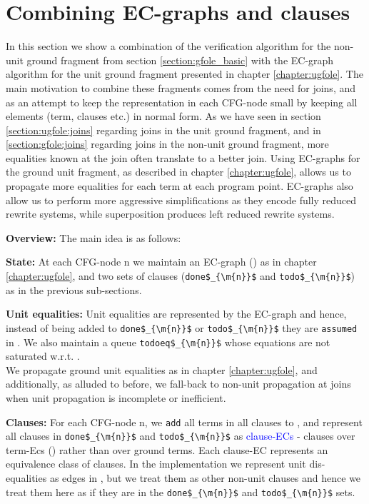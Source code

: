 \chapter{Combining EC-graphs and clauses}\label{section:appendix:gfole_ECGraph}
In this section we show a combination of the verification algorithm for the non-unit ground fragment from section \ref{section:gfole_basic} with the EC-graph algorithm for the unit ground fragment presented in chapter \ref{chapter:ugfole}.
The main motivation to combine these fragments comes from the need for joins, and as an attempt to keep the representation in each CFG-node small by keeping all elements (term, clauses etc.) in normal form.
As we have seen in section \ref{section:ugfole:joins} regarding joins in the unit ground fragment, and in \ref{section:gfole:joins} regarding joins in the non-unit ground fragment, more equalities known at the join often translate to a better join.
Using EC-graphs for the ground unit fragment, as described in chapter \ref{chapter:ugfole}, allows us to propagate more equalities for each term at each program point.
EC-graphs also allow us to perform more aggressive simplifications as they encode fully reduced rewrite systems, while superposition produces left reduced rewrite systems.

\textbf{Overview:}
The main idea is as follows:

\textbf{State:} At each CFG-node n we maintain an EC-graph () as in chapter \ref{chapter:ugfole}, and two sets of clauses (\lstinline|done$_{\m{n}}$| and \lstinline|todo$_{\m{n}}$|) as in the previous sub-sections.

\textbf{Unit equalities:} Unit equalities are represented by the EC-graph and hence, instead of being added to \lstinline|done$_{\m{n}}$| or \lstinline|todo$_{\m{n}}$| they are 
\lstinline|assumed| in . We also maintain a queue \lstinline|todoeq$_{\m{n}}$| whose equations are not saturated w.r.t. \SPG{}.\\
We propagate ground unit equalities as in chapter \ref{chapter:ugfole}, and additionally, as alluded to before, we fall-back to non-unit propagation at joins when unit propagation is incomplete or inefficient.

\textbf{Clauses:} For each CFG-node n, we \lstinline|add| all terms in all clauses to , and represent all clauses in 
\lstinline|done$_{\m{n}}$| and \lstinline|todo$_{\m{n}}$| as \textcolor{blue}{clause-ECs} - clauses over term-Ecs (\GTs{}) rather than over ground terms. Each clause-EC represents an equivalence class of clauses. In the implementation we represent unit dis-equalities as edges in , but we treat them as other non-unit clauses and hence we treat them here as if they are in the \lstinline|done$_{\m{n}}$| and \lstinline|todo$_{\m{n}}$| sets.

